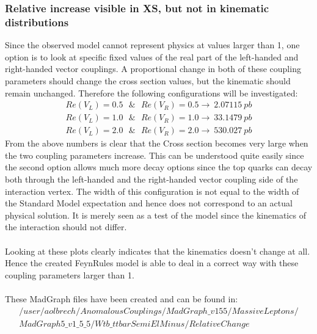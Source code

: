 \subsubsection{Relative increase visible in XS, but not in kinematic distributions}
Since the observed model cannot represent physics at values larger than 1, one option is to look at specific fixed values of the real part of the left-handed and right-handed vector couplings. 
A proportional change in both of these coupling parameters should change the cross section values, but the kinematic should remain unchanged. Therefore the following configurations will be investigated:
\begin{eqnarray*}
  Re(V_L) = 0.5 ~~~ \& ~~~ Re(V_R) = 0.5 \rightarrow ~2.07115~ pb\\
  Re(V_L) = 1.0 ~~~ \& ~~~ Re(V_R) = 1.0 \rightarrow ~33.1479~ pb\\
  Re(V_L) = 2.0 ~~~ \& ~~~ Re(V_R) = 2.0 \rightarrow ~530.027~ pb
\end{eqnarray*}
From the above numbers is clear that the Cross section becomes very large when the two coupling parameters increase.
This can be understood quite easily since the second option allows much more decay options since the top quarks can decay both through the left-handed and the right-handed vector coupling side of the interaction vertex. The width of this configuration is not equal to the width of the Standard Model expectation and hence does not correspond to an actual physical solution. It is merely seen as a test of the model since the kinematics of the interaction should not differ.\\
\\
Looking at these plots clearly indicates that the kinematics doesn't change at all.\\
Hence the created FeynRules model is able to deal in a correct way with these coupling parameters larger than 1.\\
\\
These MadGraph files have been created and can be found in:
\begin{eqnarray*}
  /user/aolbrech/AnomalousCouplings/MadGraph\_v155/MassiveLeptons/\\ MadGraph5\_v1\_5\_5/Wtb\_ttbarSemiElMinus/RelativeChange
\end{eqnarray*}


